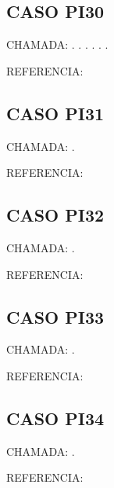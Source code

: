 \documentclass{undftex}
\begin{document}
\begin{refsection}\section*{CASO PI30} CHAMADA: . \textcite{pi02}. . . . . \textcite{pi23}\par REFERENCIA:\par\printbibliography[heading=none,check=undfconsultadas]\end{refsection}\clearpage
\begin{refsection}\section*{CASO PI31} CHAMADA: . \textcite{pi31}\par REFERENCIA:\par\printbibliography[heading=none,check=undfconsultadas]\end{refsection}\clearpage
\begin{refsection}\section*{CASO PI32} CHAMADA: . \textcite{pi32}\par REFERENCIA:\par\printbibliography[heading=none,check=undfconsultadas]\end{refsection}\clearpage
\begin{refsection}\section*{CASO PI33} CHAMADA: . \textcite{pi33}\par REFERENCIA:\par\printbibliography[heading=none,check=undfconsultadas]\end{refsection}\clearpage
\begin{refsection}\section*{CASO PI34} CHAMADA: . \textcite{pi34}\par REFERENCIA:\par\printbibliography[heading=none,check=undfconsultadas]\end{refsection}\clearpage
\end{document}
